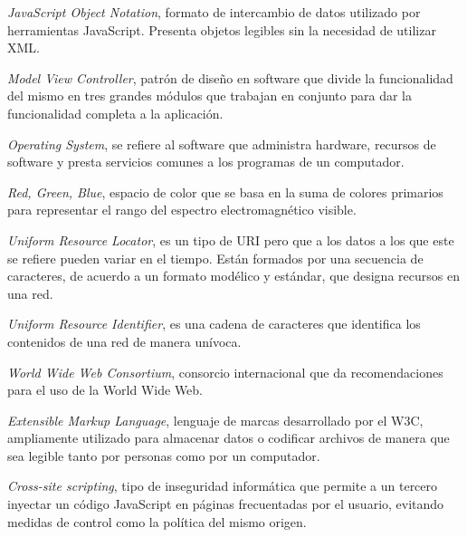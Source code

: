 \begin{description}[labelindent=1cm,labelwidth=2.25cm,align=left,leftmargin=3.45cm]
	\item[$JSON$] \emph{JavaScript Object Notation}, formato de intercambio de datos utilizado por herramientas JavaScript. Presenta objetos legibles sin la necesidad de utilizar XML.
	\item[$MVC$] \emph{Model View Controller}, patrón de diseño en software que divide la funcionalidad del mismo en tres grandes módulos que trabajan en conjunto para dar la funcionalidad completa a la aplicación.
	\item[$OS$] \emph{Operating System}, se refiere al software que administra hardware, recursos de software y presta servicios comunes a los programas de un computador.
	\item[$RGB$] \emph{Red, Green, Blue}, espacio de color que se basa en la suma de colores primarios para representar el rango del espectro electromagnético visible.
	\item[$URL$] \emph{Uniform Resource Locator}, es un tipo de URI pero que a los datos a los que este se refiere pueden variar en el tiempo. Están formados por una secuencia de caracteres, de acuerdo a un formato modélico y estándar, que designa recursos en una red.
	\item[$URI$] \emph{Uniform Resource Identifier}, es una cadena de caracteres que identifica los contenidos de una red de manera unívoca.
	\item[$W3C$] \emph{World Wide Web Consortium}, consorcio internacional que da recomendaciones para el uso de la World Wide Web.
	\item[$XML$] \emph{Extensible Markup Language}, lenguaje de marcas desarrollado por el W3C, ampliamente utilizado para almacenar datos o codificar archivos de manera que sea legible tanto por personas como por un computador.
	\item[$XSS$] \emph{Cross-site scripting}, tipo de inseguridad informática que permite a un tercero inyectar un código JavaScript en páginas frecuentadas por el usuario, evitando medidas de control como la política del mismo origen.
\end{description}
